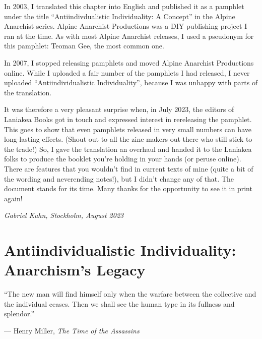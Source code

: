 In 2003, I translated this chapter into English and published it as a pamphlet
under the title “Antiindivdualistic Individuality: A Concept” in the Alpine
Anarchist series. Alpine Anarchist Productions was a DIY publishing project I
ran at the time. As with most Alpine Anarchist releases, I used a pseudonym for
this pamphlet: Teoman Gee, the most common one.

In 2007, I stopped releasing pamphlets and moved Alpine Anarchist Productions
online. While I uploaded a fair number of the pamphlets I had released, I never
uploaded “Antiindividualistic Individuality”, because I was unhappy with parts
of the translation.

It was therefore a very pleasant surprise when, in July 2023, the editors of
Laniakea Books got in touch and expressed interest in rereleasing the pamphlet.
This goes to show that even pamphlets released in very small numbers can have
long-lasting effects. (Shout out to all the zine makers out there who still
stick to the trade!) So, I gave the translation an overhaul and handed it to
the Laniakea folks to produce the booklet you’re holding in your hands (or
peruse online). There are features that you wouldn’t find in current texts of
mine (quite a bit of the wording and neverending notes!), but I didn’t change
any of that. The document stands for its time. Many thanks for the opportunity
to see it in print again!

\bigskip

\noindent\emph{Gabriel Kuhn, Stockholm, August 2023}

\clearpage

\setcounter{page}{1}

\newpage

\vspace*{2.5cm}
\section*{Antiindividualistic Individuality:\\Anarchism’s Legacy}
\vspace*{4cm}

\begin{adjustwidth}{5em}{0pt}
    \setlength{\parindent}{0pt}
    \setlength{\parskip}{0.5\baselineskip}

    “The new man will find himself only when the warfare between the collective
    and the individual ceases. Then we shall see the human type in its fullness
    and splendor.”

    — Henry Miller, \emph{The Time of the Assassins}
\end{adjustwidth}
\vspace{2\baselineskip}

